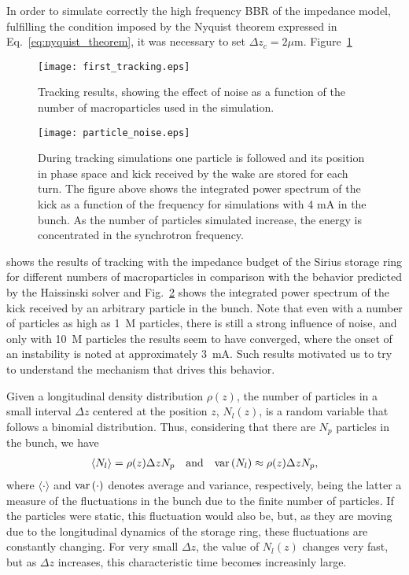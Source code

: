 \begin{apendicesenv}
    In order to simulate correctly the high frequency BBR of the impedance model, fulfilling the condition imposed by the Nyquist theorem expressed in Eq.~\eqref{eq:nyquist_theorem}, it was necessary to set $\Delta z_c= 2\mu$m. Figure~\ref{fig:first_tracking}
    \begin{figure}[b!]
        \centering
        \texttt{[image: first\_tracking.eps]}
        \caption{Tracking results, showing the effect of noise as a function of the number of macroparticles used in the simulation.}
        \label{fig:first_tracking}
    \end{figure}
    \begin{figure}[b!]
        \centering
        \texttt{[image: particle\_noise.eps]}
        \caption{During tracking simulations one particle is followed and its position in phase space and kick received by the wake are stored for each turn. The figure above shows the integrated power spectrum of the kick as a function of the frequency for simulations with 4 mA in the bunch. As the number of particles simulated increase, the energy is concentrated in the synchrotron frequency.}
        \label{fig:particle_noise}
    \end{figure}
    shows the results of tracking with the impedance budget of the Sirius storage ring for different numbers of macroparticles in comparison with the behavior predicted by the Haissinski solver and Fig.~\ref{fig:particle_noise} shows the integrated power spectrum of the kick received by an arbitrary particle in the bunch. Note that even with a number of particles as high as 1~M particles, there is still a strong influence of noise, and only with 10~M particles the results seem to have converged, where the onset of an instability is noted at approximately 3~mA. Such results motivated us to try to understand the mechanism that drives this behavior.

    Given a longitudinal density distribution $\rho(z)$, the number of particles in a small interval $\Delta z$ centered at the position $z$, $N_l(z)$, is a random variable that follows a binomial distribution. Thus, considering that there are $N_p$ particles in the bunch, we have
    \begin{align}
        \langle N_l \rangle = \rho(z)\Delta z N_p
        \quad \text{and}\quad
        \text{var}\left(N_l\right) \approx \rho(z)\Delta z N_p,
    \end{align}
    where $\langle\cdot\rangle$ and $\text{var}\left(\cdot\right)$ denotes average and variance, respectively, being the latter a measure of the fluctuations in the bunch due to the finite number of particles. If the particles were static, this fluctuation would also be, but, as they are moving due to the longitudinal dynamics of the storage ring, these fluctuations are constantly changing. For very small $\Delta z$, the value of $N_l(z)$ changes very fast, but as $\Delta z$ increases, this characteristic time becomes increasinly large.


\end{apendicesenv}
